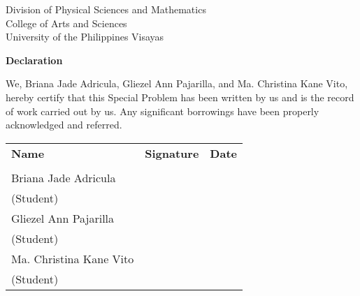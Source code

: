 \begin{center}
	Division of Physical Sciences and Mathematics\\
	College of Arts and Sciences\\
	University of the Philippines Visayas 
	
		\textbf{Declaration}
		\end{center}

We,  Briana Jade Adricula, Gliezel Ann Pajarilla, and Ma. Christina Kane Vito, hereby certify that this Special Problem has been written by us  and is the record of work carried out by us. Any significant borrowings have been properly acknowledged and referred.

	\begin{tabular}{lll}
	\bfseries Name  & \bfseries Signature & \bfseries Date\\ \\
	Briana Jade Adricula &\signaturerule  & \signaturerule\\ 
	\multicolumn{1}{l}{(Student)} \\ 
	Gliezel Ann Pajarilla &\signaturerule  & \signaturerule\\ 
	\multicolumn{1}{l}{(Student)} \\
	Ma. Christina Kane Vito &\signaturerule  & \signaturerule\\ 
\multicolumn{1}{l}{(Student)} \\

\end{tabular}



